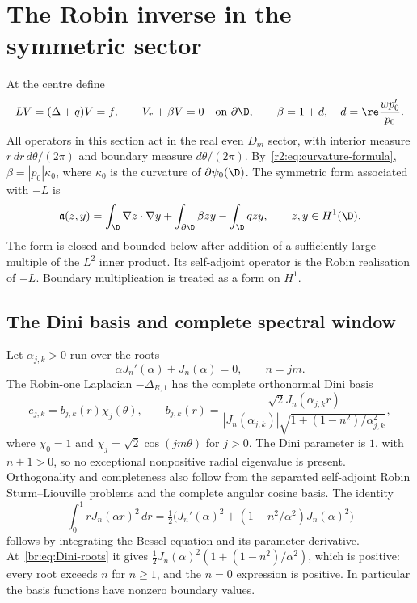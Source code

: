 \section{The Robin inverse in the symmetric sector}\label{br:sec:spectrum}
At the centre define
\begin{equation}\label{br:eq:Robin}
 LV=(\Delta+q)V=f,\qquad V_r+\beta V=0\quad\text{on }\partial\D,
 \qquad \beta=1+d,\quad d=\re\frac{wp_0'}{p_0}.
\end{equation}
All operators in this section act in the real even $D_m$ sector, with
interior measure $r\,dr\,d\theta/(2\pi)$ and boundary measure
$d\theta/(2\pi)$. By~\eqref{r2:eq:curvature-formula}, $\beta=|p_0|\kappa_0$,
where $\kappa_0$ is the curvature of $\partial\psi_0(\D)$. The symmetric form associated with $-L$ is
\begin{equation}\label{br:eq:Robin-form}
 \mathfrak a(z,y)=\int_\D\nabla z\cdot\nabla y
 +\int_{\partial\D}\beta zy-\int_\D qzy,
 \qquad z,y\in H^1(\D).
\end{equation}
The form is closed and bounded below after addition of a sufficiently large
multiple of the $L^2$ inner product. Its self-adjoint operator is the Robin
realisation of $-L$. Boundary multiplication is treated as a form on $H^1$.

\subsection{The Dini basis and complete spectral window}\label{br:sec:coverage}
Let $\alpha_{j,k}>0$ run over the roots
\begin{equation}\label{br:eq:Dini-roots}
 \alpha J_n'(\alpha)+J_n(\alpha)=0,\qquad n=jm.
\end{equation}
The Robin-one Laplacian $-\Delta_{R,1}$ has the complete orthonormal Dini
basis
\begin{equation}\label{br:eq:basis}
 e_{j,k}=b_{j,k}(r)\chi_j(\theta),\qquad
 b_{j,k}(r)=\frac{\sqrt2J_n(\alpha_{j,k}r)}
 {|J_n(\alpha_{j,k})|\sqrt{1+(1-n^2)/\alpha_{j,k}^2}},
\end{equation}
where $\chi_0=1$ and $\chi_j=\sqrt2\cos(jm\theta)$ for $j>0$.
The Dini parameter is $1$, with $n+1>0$, so no exceptional nonpositive
radial eigenvalue is present. Orthogonality and completeness also follow
from the separated self-adjoint Robin Sturm--Liouville problems and the
complete angular cosine basis. The identity
\[
 \int_0^1rJ_n(\alpha r)^2\,dr
 =\tfrac12\bigl(J_n'(\alpha)^2+(1-n^2/\alpha^2)J_n(\alpha)^2\bigr)
\]
follows by integrating the Bessel equation and its parameter derivative.
At~\eqref{br:eq:Dini-roots} it gives
$\tfrac12J_n(\alpha)^2(1+(1-n^2)/\alpha^2)$, which is positive:
every root exceeds $n$ for $n\ge1$, and the $n=0$ expression is positive.
In particular the basis functions have nonzero boundary values.

